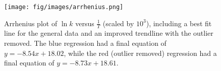 \begin{figure}[!htb]
    \centering
    \texttt{[image: fig/images/arrhenius.png]}
    \caption{Arrhenius plot of $\ln{k}$ versus $\frac{1}{T}$ (scaled by $10^3$), including a best fit line for the general data and an improved trendline with the outlier removed. The blue regression had a final equation of $y = -8.54x + 18.02$, while the red (outlier removed) regression had a final equation of $y = -8.73x + 18.61$.}
    \label{fig:arrhenius}
\end{figure}